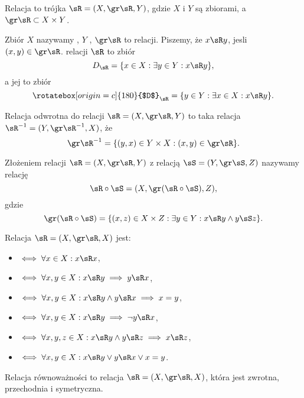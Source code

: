 \begin{definition}
    Relacja to trójka $\sR = (X, \gr\sR, Y)$, gdzie $X$ i $Y$ są zbiorami, a $\gr \sR \subset X \times Y$.
\end{definition}

Zbiór $X$ nazywamy , $Y$ , $\gr \sR$ to  relacji. Piszemy, że $x \sR y$, jesli $(x, y) \in \gr\sR$.  relacji $\sR$ to zbiór
$$ D_\sR = \{x \in X : \exists y \in Y : x \sR y\}, $$
a jej  to zbiór
$$ \rotatebox[origin=c]{180}{$D$}_\sR = \{y \in Y : \exists x \in X : x \sR y\}. $$

\begin{definition}
    Relacja odwrotna do relacji $\sR = (X, \gr\sR, Y)$ to taka relacja $\sR^{-1} = (Y, \gr\sR^{-1}, X)$, że
    $$ \gr \sR^{-1} = \{(y, x) \in Y \times X : (x, y) \in \gr\sR\}. $$
\end{definition}

\begin{definition}
    Złożeniem relacji $\sR = (X, \gr\sR, Y)$ z relacją $\sS = (Y, \gr\sS, Z)$ nazywamy relację
    $$ \sR \circ \sS = (X, \gr(\sR \circ \sS), Z), $$
    gdzie
    $$ \gr(\sR \circ \sS) = \{(x, z) \in X \times Z : \exists y \in Y : x \sR y \wedge y \sS z\}. $$
\end{definition}

\begin{definition}
    Relacja $\sR = (X, \gr\sR, X)$ jest:
    \begin{itemize}[--]
        \item {} $\iff \forall x\in X : x \sR x$,
        \item {} $\iff \forall x, y \in X : x \sR y \implies y \sR x$,
        \item {} $\iff \forall x, y \in X : x \sR y \wedge y \sR x \implies x = y$,
        \item {} $\iff \forall x, y \in X : x \sR y \implies \neg y \sR x$,
        \item {} $\iff \forall x, y, z \in X : x \sR y \wedge y \sR z \implies x \sR z$,
        \item {} $\iff \forall x, y \in X : x \sR y \vee y \sR x \vee x = y$.
    \end{itemize}
\end{definition}

\begin{definition}
    Relacja równoważności to relacja $\sR = (X, \gr\sR, X)$, która jest zwrotna, przechodnia i symetryczna.
\end{definition}

